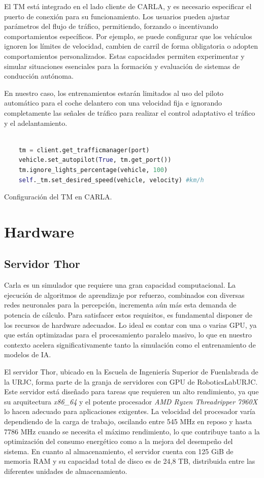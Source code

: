 El \ac{TM} está integrado en el lado cliente de CARLA, y es necesario especificar el puerto de conexión para su funcionamiento. Los usuarios pueden ajustar parámetros del flujo de tráfico, permitiendo, forzando o incentivando comportamientos específicos. Por ejemplo, se puede configurar que los vehículos ignoren los límites de velocidad, cambien de carril de forma obligatoria o adopten comportamientos personalizados. Estas capacidades permiten experimentar y simular situaciones esenciales para la formación y evaluación de sistemas de conducción autónoma.

En nuestro caso, los entrenamientos estarán limitados al uso del piloto automático para el coche delantero con una velocidad fija e ignorando completamente las señales de tráfico para realizar el control adaptativo el tráfico y el adelantamiento. 
\begin{code}[h]
	\begin{lstlisting}[language=python]
	
	tm = client.get_trafficmanager(port)
	vehicle.set_autopilot(True, tm.get_port())  
	tm.ignore_lights_percentage(vehicle, 100) 
	self._tm.set_desired_speed(vehicle, velocity) #km/h
\end{lstlisting}
\caption[Configuración del \ac{TM} en CARLA]{Configuración del \ac{TM} en CARLA.}
\label{cod:tm_carla}
\end{code}

\section{Hardware}
\label{sec:hw}
\subsection{Servidor Thor}
\label{sec:thor}

Carla es un simulador que requiere una gran capacidad computacional. La ejecución de algoritmos de aprendizaje por refuerzo, combinados con diversas redes neuronales para la percepción, incrementa aún más esta demanda de potencia de cálculo. Para satisfacer estos requisitos, es fundamental disponer de los recursos de hardware adecuados. Lo ideal es contar con una o varias \ac{GPU}, ya que están optimizadas para el procesamiento paralelo masivo, lo que en nuestro contexto acelera significativamente tanto la simulación como el entrenamiento de modelos de \ac{IA}. 

El servidor Thor, ubicado en la Escuela de Ingeniería Superior de Fuenlabrada de la \ac{URJC}, forma parte de la granja de servidores con \ac{GPU} de RoboticsLabURJC. Este servidor está diseñado para tareas que requieren un alto rendimiento, ya que su arquitectura \textit{x86\_64} y el potente procesador \textit{AMD Ryzen Threadripper 7960X} lo hacen adecuado para aplicaciones exigentes. La velocidad del procesador varía dependiendo de la carga de trabajo, oscilando entre 545 MHz en reposo y hasta 7786 MHz cuando se necesita el máximo rendimiento, lo que contribuye tanto a la optimización del consumo energético como a la mejora del desempeño del sistema. En cuanto al almacenamiento, el servidor cuenta con 125 GiB de memoria \ac{RAM} y su capacidad total de disco es de 24,8 TB, distribuida entre las diferentes unidades de almacenamiento.

